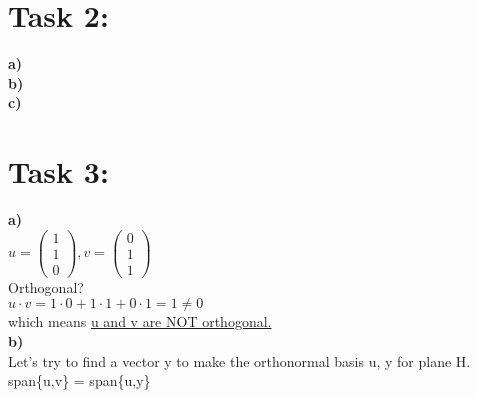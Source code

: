 \documentclass[11pt]{amsart}
\begin{document}
\section{Task 2:}

\textbf{a)}\\
 
\textbf{b)}\\

\textbf{c)}\\
\section{Task 3:}


 
\textbf{a)}\\

$u = \begin{pmatrix} 1\\1\\0 \end{pmatrix}, v = \begin{pmatrix} 0\\1\\1 \end{pmatrix}$ \\

Orthogonal?\\

$u \cdot v = 1\cdot0 + 1\cdot1 + 0\cdot1 = 1 \neq 0$\\

which means \underline{u and v are NOT orthogonal.}\\

\textbf{b)}\\

Let's try to find a vector y to make the orthonormal basis u, y for plane H.\\

span\{u,v\} = span\{u,y\} \\
\end{document}
